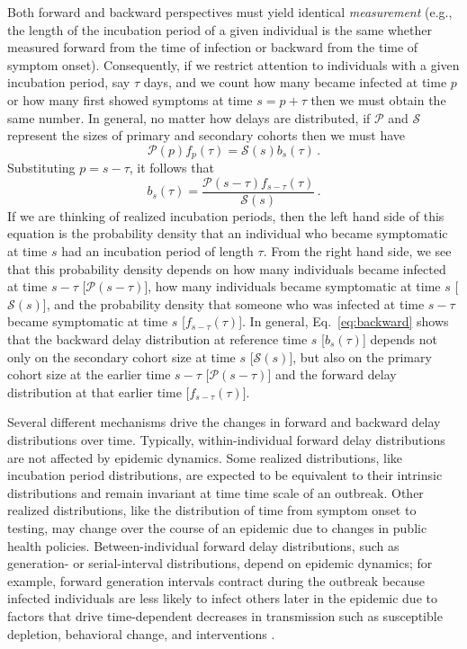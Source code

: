 \documentclass[12pt]{article}
\newcommand{\psymp}{\ensuremath{p}} %
\newcommand{\ssymp}{\ensuremath{s}} %
\newcommand{\psize}{{\mathcal P}} %
\newcommand{\ssize}{{\mathcal S}} %
\begin{document}
Both forward and backward perspectives
must yield identical \emph{measurement} (e.g., the length of the incubation
period of a given individual is the same whether measured forward from
the time of infection or backward from the time of symptom onset).
Consequently, if we restrict attention to individuals with a given
incubation period, say $\tau$ days, and we count how many became infected at time $\psymp$
or how many first showed symptoms at time $\ssymp=\psymp+\tau$ then we must obtain
the same number. In general, no matter how delays are distributed, if
$\mathcal P$ and $\mathcal S$ represent the sizes of primary and
secondary cohorts then we must have
\begin{equation}
\psize(\psymp) f_\psymp(\tau) = \ssize(\ssymp) b_\ssymp(\tau) \,.
\label{eq:match}
\end{equation}
Substituting $\psymp=\ssymp-\tau$, it follows that
\begin{equation}
b_\ssymp(\tau)= \frac{\psize(\ssymp-\tau) f_{\ssymp-\tau} (\tau)}{\ssize(\ssymp)}\,.
\label{eq:backward}
\end{equation}
If we are thinking of realized incubation periods, then the left hand side of
this equation is the probability density that an individual
who became symptomatic at time $\ssymp$ had an incubation period of
length $\tau$. From the right hand side, we see that this probability
density depends on how many individuals became infected at time
$\ssymp-\tau$ [$\psize(\ssymp-\tau)$], how many individuals became
symptomatic at time $\ssymp$ [$\ssize(\ssymp)$], and the probability density
that someone who was infected at time $\ssymp-\tau$ became symptomatic at
time $\ssymp$ [$f_{\ssymp-\tau}(\tau)$]. In general, Eq.~\eqref{eq:backward}
shows that the backward delay distribution at reference time $\ssymp$
[$b_\ssymp(\tau)$] depends not only on the secondary cohort size at time
$\ssymp$ [$\ssize(\ssymp)$], but also on the primary cohort size at the
earlier time $\ssymp-\tau$ [$\psize(\ssymp-\tau)$] and the forward delay
distribution at that earlier time [$f_{\ssymp-\tau}(\tau)$].

Several different mechanisms drive the changes in forward and backward delay distributions over time.
Typically, within-individual forward delay distributions are not affected by epidemic dynamics.
Some realized distributions, like incubation period distributions, are expected to be equivalent to their intrinsic distributions and remain invariant at time time scale of an outbreak.
Other realized distributions, like the distribution of time from symptom onset to testing, may change over the course of an epidemic due to changes in public health policies.
Between-individual forward delay distributions, such as generation- or serial-interval distributions, depend on epidemic dynamics;
for example, forward generation intervals contract during the outbreak because infected individuals are less likely to infect others later in the epidemic due to factors that drive time-dependent decreases in transmission such as susceptible depletion, behavioral change, and interventions \citep{champredon2015intrinsic}.
\end{document}
